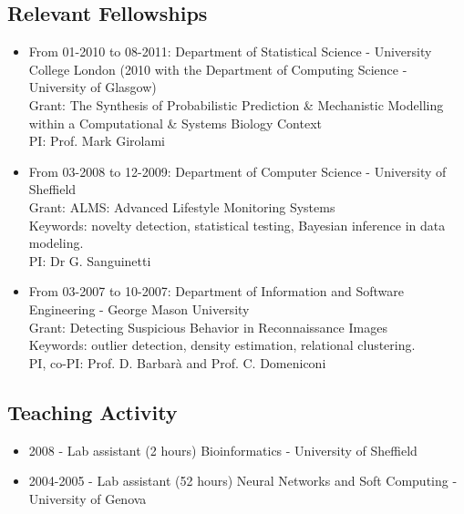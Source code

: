 \documentclass[a4paper,10pt]{article}
\begin{document}
\subsection*{Relevant Fellowships}
\begin{itemize}
\item From 01-2010 to 08-2011:
  Department of Statistical Science - University College London (2010 with the Department of Computing Science - University of Glasgow) \\
  Grant: The Synthesis of Probabilistic Prediction \& Mechanistic Modelling within a Computational \& Systems Biology Context \\
  PI: Prof. Mark Girolami

\item From 03-2008 to 12-2009: 
  Department of Computer Science - University of Sheffield \\
  Grant: ALMS: Advanced Lifestyle Monitoring Systems \\
  Keywords: novelty detection, statistical testing, Bayesian inference in data modeling. \\
  PI: Dr G. Sanguinetti

\item From 03-2007 to 10-2007: 
  Department of Information and Software Engineering - George Mason University \\
  Grant: Detecting Suspicious Behavior in Reconnaissance Images \\
  Keywords: outlier detection, density estimation, relational clustering. \\
  PI, co-PI: Prof. D. Barbar\`a and Prof. C. Domeniconi
\end{itemize}


\subsection*{Teaching Activity}
\begin{itemize}
\item 2008 - Lab assistant (2 hours) 
  Bioinformatics - University of Sheffield

\item 2004-2005 - Lab assistant (52 hours)
  Neural Networks and Soft Computing - University of Genova
\end{itemize}
\end{document}
